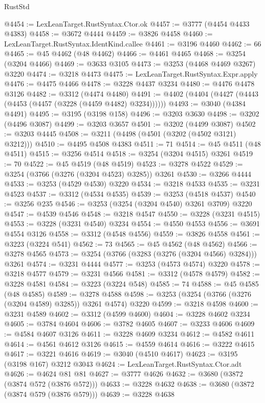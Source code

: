 \begin{lexlean}{RustStd}
\begin{coremodule}
{\begin{coremodule}
{{{{{{{{{{{{{{{{{{{{{{{{{{{{{{{{{{{{{@4454 := LexLeanTarget.RustSyntax.Ctor.ok
@4457 := @3777 (@4454 @4433 @4383)
@4458 := @3672 @4444
@4459 := @3826 @4458
@4460 := LexLeanTarget.RustSyntax.IdentKind.callee
@4461 := @3196 @4460
@4462 := 66
@4465 := @45 @4462 (@48 @4462)
@4466 := @4461 @4465
@4468 := @3254 (@3204 @4466)
@4469 := @3633 @3105
@4473 := @3253 (@4468 @4469 @3267) @3220
@4474 := @3218 @4473
@4475 := LexLeanTarget.RustSyntax.Expr.apply
@4476 := @4475 @4466
@4478 := @3228 @4437 @3234
@4480 := @4476 @4478 @3126
@4482 := @3312 (@4474 @4480)
@4491 := @4402 (@4404 (@4427 (@4443 (@4453 (@4457 (@3228 (@4459 @4482) @3234))))))
@4493 := @3040 (@4384 @4491)
@4495 := @3195 (@3198 @158)
@4496 := @3203 @3630
@4498 := @3202 (@4496 @3087)
@4499 := @3203 @3657
@4501 := @3202 (@4499 @3087)
@4502 := @3203 @4445
@4508 := @3211 (@4498 (@4501 (@3202 (@4502 @3121) @3212)))
@4510 := @4495 @4508 @4383
@4511 := 71
@4514 := @45 @4511 (@48 @4511)
@4515 := @3256 @4514
@4518 := @3254 (@3204 @4515) @3261
@4519 := 70
@4522 := @45 @4519 (@48 @4519)
@4523 := @3278 @4522
@4529 := @3254 (@3766 (@3276 (@3204 @4523) @3285)) @3261
@4530 := @3266 @4444
@4533 := @3253 (@4529 @4530) @3220
@4534 := @3218 @4533
@4535 := @3231 @4523
@4537 := @3312 (@4534 @4535)
@4539 := @3253 (@4518 @4537)
@4540 := @3256 @235
@4546 := @3253 (@3254 (@3204 @4540) @3261 @3709) @3220
@4547 := @4539 @4546
@4548 := @3218 @4547
@4550 := @3228 (@3231 @4515)
@4553 := @3228 (@3231 @4540) @3234
@4554 := @4550 @4553
@4556 := @3691 @4554 @3126
@4558 := @3312 (@4548 @4556)
@4559 := @3826 @4558
@4561 := @3223 (@3224 @541)
@4562 := 73
@4565 := @45 @4562 (@48 @4562)
@4566 := @3278 @4565
@4573 := @3254 (@3766 (@3283 (@3276 (@3204 @4566) @3284))) @3261
@4574 := @3231 @4444
@4577 := @3253 (@4573 @4574) @3220
@4578 := @3218 @4577
@4579 := @3231 @4566
@4581 := @3312 (@4578 @4579)
@4582 := @3228 @4581
@4584 := @3223 (@3224 @548)
@4585 := 74
@4588 := @45 @4585 (@48 @4585)
@4589 := @3278 @4588
@4598 := @3253 (@3254 (@3766 (@3276 (@3204 @4589) @3285)) @3261 @4574) @3220
@4599 := @3218 @4598
@4600 := @3231 @4589
@4602 := @3312 (@4599 @4600)
@4604 := @3228 @4602 @3234
@4605 := @3784 @4604
@4606 := @3782 @4605
@4607 := @3233 @4606
@4609 := @4584 @4607 @3126
@4611 := @3228 @4609 @3234
@4612 := @4582 @4611
@4614 := @4561 @4612 @3126
@4615 := @4559 @4614
@4616 := @3222 @4615
@4617 := @3221 @4616
@4619 := @3040 (@4510 @4617)
@4623 := @3195 (@3198 @167) @3212 @3043
@4624 := LexLeanTarget.RustSyntax.Ctor.adt
@4626 := @4624 @81 @81
@4627 := @3777 @4626
@4632 := @3680 (@3872 (@3874 @572 (@3876 @572)))
@4633 := @3228 @4632
@4638 := @3680 (@3872 (@3874 @579 (@3876 @579)))
@4639 := @3228 @4638
}}}}}}}}}}}}}}}}}}}}}}}}}}}}}}}}}}}}}
\end{coremodule}}
\end{coremodule}
\end{lexlean}
